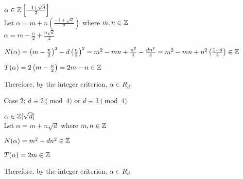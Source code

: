 \documentclass[letterpaper,12pt,fleqn]{article}
\newcommand{\sd}{\sqrt{d}}
\newcommand{\Zd}{\Z[\sd]}
\newcommand{\w}{\frac{-1+\sd}{2}}
\newcommand{\Zw}{\Z\left[\w\right]}
\renewcommand{\a}{\alpha}
\begin{document}
\begin{theproof}
\begin{description}
\begin{description}
      $\a\in\Zw$ \\
      Let $\a=m+n\left(\frac{-1+\sd}{2}\right)$ where $m,n\in\mathbb{Z}$ \\
      $\a=m-\frac{n}{2}+\frac{n\sd}{2}$

      $N(\a)=\left(m-\frac{n}{2}\right)^2-d\left(\frac{n}{2}\right)^2=
      m^2-mn+\frac{n^2}{4}-\frac{dn^2}{4}=
      m^2-mn+n^2\left(\frac{1-d}{4}\right)\in\Z$

      $T(\a)=2\left(m-\frac{n}{2}\right)=2m-n\in\Z$

      Therefore, by the integer criterion, $\a\in R_d$

    \item Case 2: $d\equiv2\pmod4$ or $d\equiv3\pmod4$
    
      $\a\in\Zd$ \\
      Let $\a=m+n\sd$ where $m,n\in\mathbb{Z}$

      $N(\a)=m^2-dn^2\in\Z$

      $T(\a)=2m\in\Z$
    
      Therefore, by the integer criterion, $\a\in R_d$
    \end{description}
  \end{description}
\end{theproof}
\end{document}
